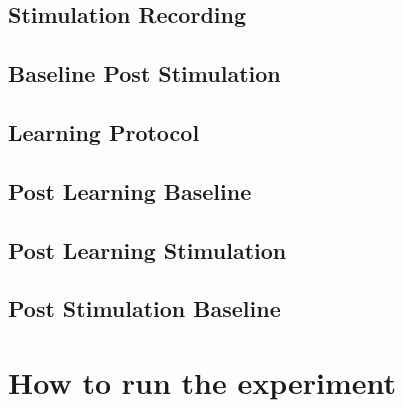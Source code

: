 \documentclass{article}
\begin{document}
\subsection{Stimulation Recording}

\subsection{Baseline Post Stimulation}

\subsection{Learning Protocol}

\subsection{Post Learning Baseline}

\subsection{Post Learning Stimulation}

\subsection{Post Stimulation Baseline}

\section{How to run the experiment}
\end{document}
